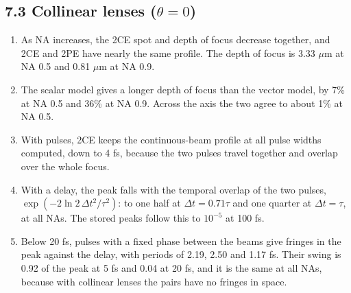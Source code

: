 \documentclass[10pt]{article}
\begin{document}
\subsection*{7.3 Collinear lenses ($\theta = 0$)}
\begin{enumerate}
\item As NA increases, the 2CE spot and depth of focus decrease together, and 2CE and 2PE have nearly the same
profile. The depth of focus is 3.33 $\mu$m at NA 0.5 and 0.81 $\mu$m at NA 0.9.
\item The scalar model gives a longer depth of focus than the vector model, by 7\% at NA 0.5 and 36\% at NA 0.9.
Across the axis the two agree to about 1\% at NA 0.5.
\item With pulses, 2CE keeps the continuous-beam profile at all pulse widths computed, down to 4 fs, because the
two pulses travel together and overlap over the whole focus.
\item With a delay, the peak falls with the temporal overlap of the two pulses,
$\exp(-2\ln 2\,\Delta t^2/\tau^2)$: to one half at $\Delta t = 0.71\tau$ and one quarter at $\Delta t = \tau$,
at all NAs. The stored peaks follow this to $10^{-5}$ at 100 fs.
\item Below 20 fs, pulses with a fixed phase between the beams give fringes in the peak against the delay, with
periods of 2.19, 2.50 and 1.17 fs. Their swing is 0.92 of the peak at 5 fs and 0.04 at 20 fs, and it is the same
at all NAs, because with collinear lenses the pairs have no fringes in space.
\end{enumerate}
\end{document}
